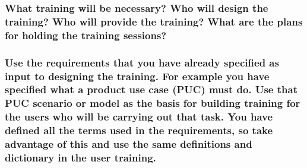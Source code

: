 \documentclass[
]{article}
\begin{document}
\hypertarget{what-training-will-be-necessary-who-will-design-the-training-who-will-provide-the-training-what-are-the-plans-for-holding-the-training-sessions}{%
\subsubsection{What training will be necessary? Who will design the
training? Who will provide the training? What are the plans for holding
the training
sessions?}\label{what-training-will-be-necessary-who-will-design-the-training-who-will-provide-the-training-what-are-the-plans-for-holding-the-training-sessions}}

\hypertarget{use-the-requirements-that-you-have-already-specified-as-input-to-designing-the-training.-for-example-you-have-specified-what-a-product-use-case-puc-must-do.-use-that-puc-scenario-or-model-as-the-basis-for-building-training-for-the-users-who-will-be-carrying-out-that-task.-you-have-defined-all-the-terms-used-in-the-requirements-so-take-advantage-of-this-and-use-the-same-definitions-and-dictionary-in-the-user-training.}{%
\subsubsection{\texorpdfstring{Use the requirements that you have
already specified as input to designing the training. For example you
have specified what a product use case (PUC) must do. Use that PUC
scenario or model as the basis for building training for the users who
will be carrying out that task. You have defined all the terms used in
the requirements, so take advantage of this and use the same definitions
and dictionary in the user training.
}{Use the requirements that you have already specified as input to designing the training. For example you have specified what a product use case (PUC) must do. Use that PUC scenario or model as the basis for building training for the users who will be carrying out that task. You have defined all the terms used in the requirements, so take advantage of this and use the same definitions and dictionary in the user training. }}\label{use-the-requirements-that-you-have-already-specified-as-input-to-designing-the-training.-for-example-you-have-specified-what-a-product-use-case-puc-must-do.-use-that-puc-scenario-or-model-as-the-basis-for-building-training-for-the-users-who-will-be-carrying-out-that-task.-you-have-defined-all-the-terms-used-in-the-requirements-so-take-advantage-of-this-and-use-the-same-definitions-and-dictionary-in-the-user-training.}}
\end{document}
